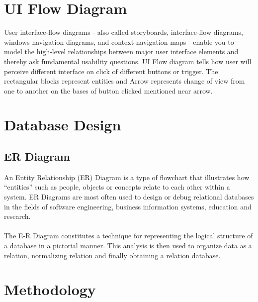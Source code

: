 \section{UI Flow Diagram}
User interface-flow diagrams - also called storyboards, interface-flow diagrams, windows navigation diagrams, and context-navigation maps - enable you to model the high-level relationships between major user interface elements and thereby ask fundamental usability questions. UI Flow diagram tells how user will perceive different interface on click of different buttons or trigger. The rectangular blocks represent entities and Arrow represents change of view from one to another on the bases of button clicked mentioned near arrow. 
\newpage
 \section{Database Design}

 \subsection{ER Diagram}
An Entity Relationship (ER) Diagram is a type of flowchart that illustrates how “entities” such as people, objects or concepts relate to each other within a system. ER Diagrams are most often used to design or debug relational databases in the fields of software engineering, business information systems, education and research.\\\\
The E-R Diagram constitutes a technique for representing the logical structure of a database in a pictorial manner. This analysis is then used to organize data as a relation, normalizing relation and finally obtaining a relation database.

\newpage

\section{ Methodology}

